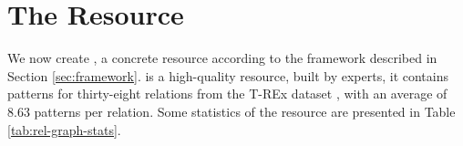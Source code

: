 \section{The \resource{} Resource}
\label{sec:rel-graph}

We now create \resource{}, a concrete resource according to the framework described in Section \ref{sec:framework}.
\resource{} is a high-quality resource, built by experts,
it contains patterns for thirty-eight relations from the T-REx dataset \cite{trex}, with an average of 8.63 patterns per relation.
Some statistics of the resource are presented in Table \ref{tab:rel-graph-stats}.








